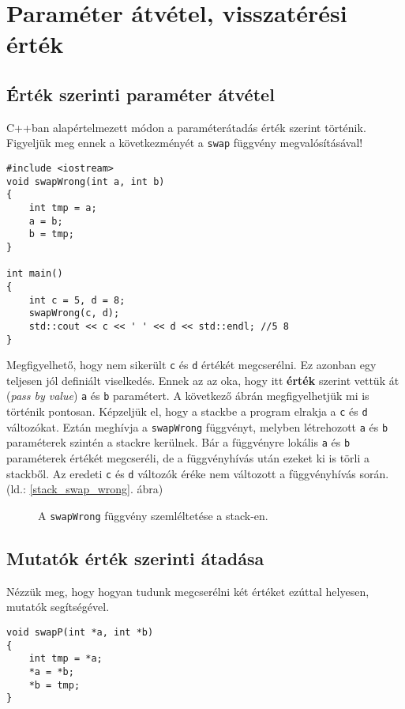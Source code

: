 \documentclass[../cpp_book/cpp_book.tex]{subfiles}
\begin{document}
	\section{Paraméter átvétel, visszatérési érték}
	\subsection{Érték szerinti paraméter átvétel}
	C++ban alapértelmezett módon a paraméterátadás érték szerint történik. Figyeljük meg ennek a következményét a \texttt{swap} függvény megvalósításával!
	\begin{lstlisting}
#include <iostream>
void swapWrong(int a, int b)
{
	int tmp = a;
	a = b;
	b = tmp;
}

int main()
{
	int c = 5, d = 8;
	swapWrong(c, d);
	std::cout << c << ' ' << d << std::endl; //5 8
}
	\end{lstlisting}		
	Megfigyelhető, hogy nem sikerült \texttt{c} és \texttt{d} értékét megcserélni. Ez azonban egy teljesen jól definiált viselkedés. Ennek az az oka, hogy itt \textbf{érték} szerint vettük át (\textit{pass by value}) \texttt{a} és \texttt{b} paramétert. A következő ábrán megfigyelhetjük mi is történik pontosan. Képzeljük el, hogy a stackbe a program elrakja a \texttt{c} és \texttt{d} változókat. Eztán meghívja a \texttt{swapWrong} függvényt, melyben létrehozott \texttt{a} és \texttt{b} paraméterek szintén a stackre kerülnek. Bár a függvényre lokális \texttt{a} és \texttt{b} paraméterek értékét megcseréli, de a függvényhívás után ezeket ki is törli a stackből. Az eredeti \texttt{c} és \texttt{d} változók éréke nem változott a függvényhívás során. (ld.: \ref{stack_swap_wrong}. ábra)
	\begin{figure}[!h]
		\centering
		
		
		\caption{A \texttt{swapWrong} függvény szemléltetése a stack-en.}\label{fig_stack_swap_wrong}
	\end{figure}
	\subsection{Mutatók érték szerinti átadása}
  	Nézzük meg, hogy hogyan tudunk megcserélni két értéket ezúttal helyesen, mutatók segítségével.
	
	\begin{lstlisting}
void swapP(int *a, int *b)
{
	int tmp = *a;
	*a = *b;
	*b = tmp;
}
	\end{lstlisting}
	
\end{document}
